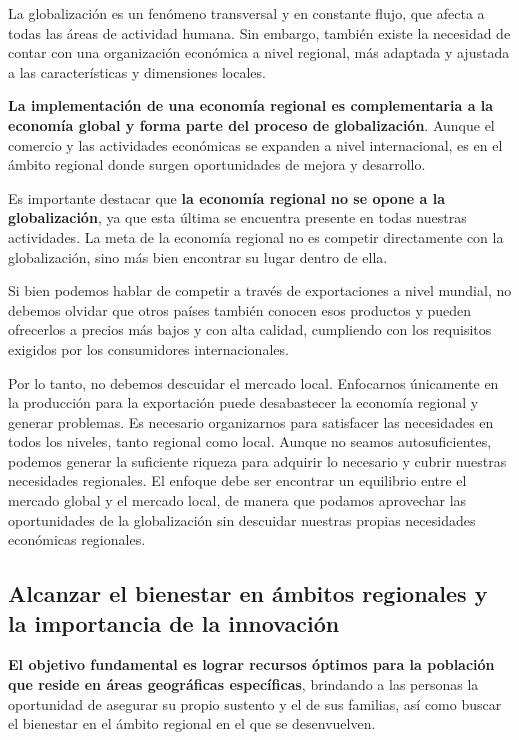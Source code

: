\documentclass[
  letterpaper,
  DIV=11,
  numbers=noendperiod]{scrartcl}
\begin{document}
La globalización es un fenómeno transversal y en constante flujo, que
afecta a todas las áreas de actividad humana. Sin embargo, también
existe la necesidad de contar con una organización económica a nivel
regional, más adaptada y ajustada a las características y dimensiones
locales.

\textbf{La implementación de una economía regional es complementaria a
la economía global y forma parte del proceso de globalización}. Aunque
el comercio y las actividades económicas se expanden a nivel
internacional, es en el ámbito regional donde surgen oportunidades de
mejora y desarrollo.

Es importante destacar que \textbf{la economía regional no se opone a la
globalización}, ya que esta última se encuentra presente en todas
nuestras actividades. La meta de la economía regional no es competir
directamente con la globalización, sino más bien encontrar su lugar
dentro de ella.

Si bien podemos hablar de competir a través de exportaciones a nivel
mundial, no debemos olvidar que otros países también conocen esos
productos y pueden ofrecerlos a precios más bajos y con alta calidad,
cumpliendo con los requisitos exigidos por los consumidores
internacionales.

Por lo tanto, no debemos descuidar el mercado local. Enfocarnos
únicamente en la producción para la exportación puede desabastecer la
economía regional y generar problemas. Es necesario organizarnos para
satisfacer las necesidades en todos los niveles, tanto regional como
local. Aunque no seamos autosuficientes, podemos generar la suficiente
riqueza para adquirir lo necesario y cubrir nuestras necesidades
regionales. El enfoque debe ser encontrar un equilibrio entre el mercado
global y el mercado local, de manera que podamos aprovechar las
oportunidades de la globalización sin descuidar nuestras propias
necesidades económicas regionales.

\hypertarget{alcanzar-el-bienestar-en-uxe1mbitos-regionales-y-la-importancia-de-la-innovaciuxf3n}{%
\subsection{Alcanzar el bienestar en ámbitos regionales y la importancia
de la
innovación}\label{alcanzar-el-bienestar-en-uxe1mbitos-regionales-y-la-importancia-de-la-innovaciuxf3n}}

\textbf{El objetivo fundamental es lograr recursos óptimos para la
población que reside en áreas geográficas específicas}, brindando a las
personas la oportunidad de asegurar su propio sustento y el de sus
familias, así como buscar el bienestar en el ámbito regional en el que
se desenvuelven.
\end{document}

